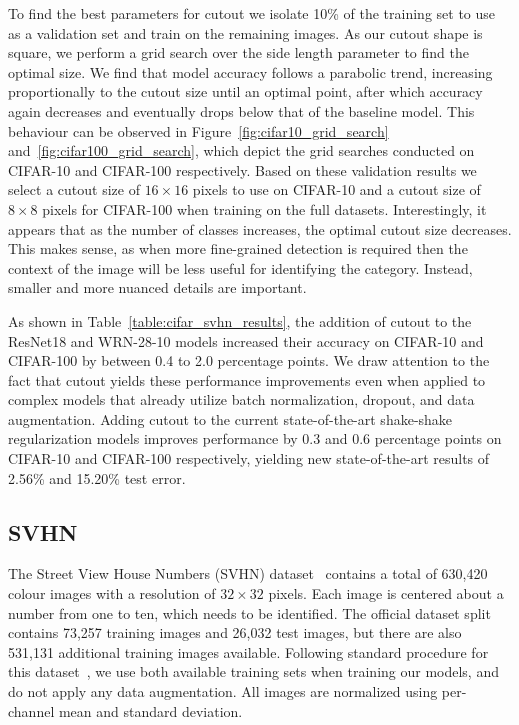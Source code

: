 \documentclass[10pt,twocolumn,letterpaper]{article}
\begin{document}
To find the best parameters for cutout we isolate 10\% of the training set to use as a validation set and train on the remaining images. As our cutout shape is square, we perform a grid search over the side length parameter to find the optimal size. We find that model accuracy follows a parabolic trend, increasing proportionally to the cutout size until an optimal point, after which accuracy again decreases and eventually drops below that of the baseline model. This behaviour can be observed in Figure~\ref{fig:cifar10_grid_search} and~\ref{fig:cifar100_grid_search}, which depict the grid searches conducted on CIFAR-10 and CIFAR-100 respectively. Based on these validation results we select a cutout size of $16 \times 16$ pixels to use on CIFAR-10 and a cutout size of $8 \times 8$ pixels for CIFAR-100 when training on the full datasets. Interestingly, it appears that as the number of classes increases, the optimal cutout size decreases. This makes sense, as when more fine-grained detection is required then the context of the image will be less useful for identifying the category. Instead, smaller and more nuanced details are important.

As shown in Table~\ref{table:cifar_svhn_results}, the addition of cutout to the ResNet18 and WRN-28-10 models increased their accuracy on CIFAR-10 and CIFAR-100 by between 0.4 to 2.0 percentage points. We draw attention to the fact that cutout yields these performance improvements even when applied to complex models that already utilize batch normalization, dropout, and data augmentation. Adding cutout to the current state-of-the-art shake-shake regularization models improves performance by 0.3 and 0.6 percentage points on CIFAR-10 and CIFAR-100 respectively, yielding new state-of-the-art results of 2.56\% and 15.20\% test error.

\subsection{SVHN}
The Street View House Numbers (SVHN) dataset~\cite{netzer2011reading} contains a total of 630,420 colour images with a resolution of $32 \times 32$ pixels. Each image is centered about a number from one to ten, which needs to be identified. The official dataset split contains 73,257 training images and 26,032 test images, but there are also 531,131 additional training images available. Following standard procedure for this dataset~\cite{zagoruyko2016wide}, we use both available training sets when training our models, and do not apply any data augmentation. All images are normalized using per-channel mean and standard deviation.
\end{document}
